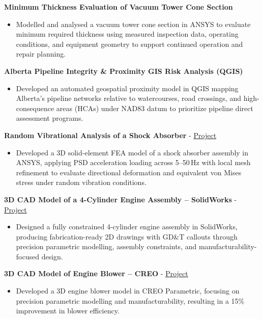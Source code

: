 \documentclass[10pt, letterpaper]{article}
\newcommand{\projhead}[1]{\vspace{5pt}\textbf{#1}\par\vspace{1pt}}
\newcommand{\projheadlink}[3]{\vspace{5pt}\textbf{#1} - \href{#3}{\textcolor{linkblue}{\underline{#2}}}\par\vspace{1pt}}
\begin{document}
\projhead{Minimum Thickness Evaluation of Vacuum Tower Cone Section}
\begin{itemize}
  \item Modelled and analysed a vacuum tower cone section in ANSYS to evaluate minimum required thickness using measured inspection data, operating conditions, and equipment geometry to support continued operation and repair planning.
\end{itemize}

\projhead{Alberta Pipeline Integrity \& Proximity GIS Risk Analysis (QGIS)}
\begin{itemize}
  \item Developed an automated geospatial proximity model in QGIS mapping Alberta's pipeline networks relative to watercourses, road crossings, and high-consequence areas (HCAs) under NAD83 datum to prioritize pipeline direct assessment programs.
\end{itemize}

\projheadlink{Random Vibrational Analysis of a Shock Absorber}{Project}{https://www.linkedin.com/posts/jaykumar-prajapati_random-vibrational-analysis-jay-prajapati-activity-7473476786862047232-W8oJ}
\begin{itemize}
  \item Developed a 3D solid-element FEA model of a shock absorber assembly in ANSYS, applying PSD acceleration loading across 5--50\,Hz with local mesh refinement to evaluate directional deformation and equivalent von Mises stress under random vibration conditions.
\end{itemize}

\projheadlink{3D CAD Model of a 4-Cylinder Engine Assembly -- SolidWorks}{Project}{https://www.linkedin.com/posts/jaykumar-prajapati_solidworks-engineeringdesign-mechanicalengineering-activity-7302416331335733250-yL2l}
\begin{itemize}
  \item Designed a fully constrained 4-cylinder engine assembly in SolidWorks, producing fabrication-ready 2D drawings with GD\&T callouts through precision parametric modelling, assembly constraints, and manufacturability-focused design.
\end{itemize}

\projheadlink{3D CAD Model of Engine Blower -- CREO}{Project}{https://www.linkedin.com/posts/jaykumar-prajapati_creo-mechanicaldesign-engineblower-activity-7303508858855899136-XrA0}
\begin{itemize}
  \item Developed a 3D engine blower model in CREO Parametric, focusing on precision parametric modelling and manufacturability, resulting in a 15\% improvement in blower efficiency.
\end{itemize}
\end{document}
